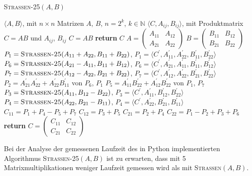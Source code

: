 \documentclass{scrartcl}
\begin{document}
\begin{algorithm}
	\caption{\textsc{Strassen-25}$(A, B)$}
	\label{alg:strassen}
	\begin{algorithmic}[1]
		\Require $\langle A, B \rangle$, mit $n \times n$ Matrizen $A$, $B$, $n = 2^k$, $k \in \mathbb{N}$
		\Ensure $\langle C, A_{ij}, B_{ij} \rangle$, mit Produktmatrix $C = AB$ und $A_{ij}$, $B_{ij}$
		 $C = AB$ %
		\State \textbf{return} $C$
		\EndIf
		\State $A = \begin{pmatrix} A_{11} & A_{12} \\ A_{21} & A_{22} \end{pmatrix}$
		\State $B = \begin{pmatrix} B_{11} & B_{12} \\ B_{21} & B_{22} \end{pmatrix}$
		\State $P_1 = \textsc{Strassen-25}(A_{11} + A_{22}, B_{11} + B_{22})$, $P_1 = \langle C^{'}, A^{'}_{11}, A^{'}_{22}, B^{'}_{11}, B^{'}_{22} \rangle$
		\State $P_6 = \textsc{Strassen-25}(A_{21} - A_{11}, B_{11} + B_{12})$, $P_6 = \langle C^{'}, A^{'}_{21}, A^{'}_{11}, B^{'}_{11}, B^{'}_{12} \rangle$
		\State $P_7 = \textsc{Strassen-25}(A_{12} - A_{22}, B_{21} + B_{22})$, $P_7 = \langle C^{'}, A^{'}_{12}, A^{'}_{22}, B^{'}_{21}, B^{'}_{22} \rangle$
		\State $P_2 = A^{'}_{21}A^{'}_{22} + A^{'}_{22}B^{'}_{11}$ von $P_6$, $P_1$ 
		\State $P_5 = A^{'}_{11}B^{'}_{22} + A^{'}_{12}B^{'}_{22}$ von $P_1$, $P_7$
		\State $P_3 = \textsc{Strassen-25}(A_{11}, B_{12} - B_{22})$, $P_3 = \langle C^{'}, A^{'}_{11}, B^{'}_{12}, B^{'}_{22} \rangle$ 
		\State $P_4 = \textsc{Strassen-25}(A_{22}, B_{21} - B_{11})$, $P_4 = \langle C^{'}, A^{'}_{22}, B^{'}_{21}, B^{'}_{11} \rangle$ 
		\State $C_{11} = P_1 + P_4 - P_5 + P_7$
		\State $C_{12} = P_3 + P_5$
		\State $C_{21} = P_2 + P_4$
		\State $C_{22} = P_1 - P_2 + P_3 + P_6$
		\State \textbf{return} $C = \begin{pmatrix} C_{11} & C_{12} \\ C_{21} & C_{22} \end{pmatrix}$
	\end{algorithmic}
\end{algorithm}

Bei der Analyse der gemessenen Laufzeit des in Python implementierten Algorithmus \textsc{Strassen-25}$(A, B)$ ist zu erwarten, dass mit 5 Matrixmultiplikationen weniger Laufzeit gemessen wird als mit \textsc{Strassen}$(A, B)$. 
\end{document}
